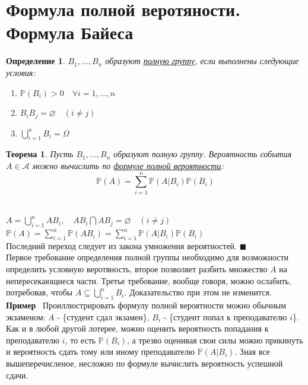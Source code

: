 \documentclass[12pt]{article}
\newtheorem{Th}{Теорема}
\newtheorem{Def}{Определение}
\newenvironment{Proof}{\par\noindent{\bf Доказательство}}{$\blacksquare$}
\newenvironment{Ex}{{\bf Пример}\ }{}
\numberwithin{Th}{section}
\numberwithin{Def}{section}
\numberwithin{Lem}{section}
\numberwithin{St}{section}
\numberwithin{equation}{section}
\newcommand\Pro{\mathbb{P}} %
\newcommand\Ev{\mathscr{A}} %
\begin{document}
\section{Формула полной веротяности. Формула Байеса}

\begin{Def}
$B_1, \ldots, B_n$ образуют \underline{полную группу}, если выполнены следующие условия:
	\begin{enumerate}
		\item $\Pro(B_i) > 0 \quad \forall i = 1, \ldots, n$
		\item $B_iB_j = \varnothing \quad (i \not= j)$
		\item $\bigcup\limits_{i=1}^nB_i = \Omega$
	\end{enumerate}
\end{Def}

\begin{Th}
Пусть $B_1, \ldots, B_n$ образуют полную группу. Вероятность события $A \in \Ev$ можно вычислить по \underline{формуле полной вероятности}:
$$\Pro(A) = \sum\limits_{i=1}^{n} \Pro(A|B_i)\Pro(B_i)$$
\end{Th}

\begin{Proof}
\\
$A=\bigcup\limits_{i=1}^{n}AB_i, \quad AB_i \bigcap AB_j = \varnothing \quad (i \not= j)$ \\
$\Pro(A) = \sum\limits_{i=1}^n \Pro(AB_i) = \sum\limits_{i=1}^{n} \Pro(A|B_i)\Pro(B_i)$ \\
Последний переход следует из  закона умножения вероятностей.
\end{Proof}
\\

Первое требование определения полной группы необходимо для возможности определить условную веротяность, второе позволяет 
разбить множество $A$ на непересекающиеся части. Третье требование, вообще говоря, можно ослабить, потребовав, чтобы $A \subseteq \bigcup\limits_{i=1}^nB_i$.
Доказательство при этом не изменится. \\
\begin{Ex}
Проиллюстрировать формулу полной вероятности можно обычным экзаменом: $A$ - \{студент сдал экзамен\}, $B_i$ - \{студент попал к преподавателю $i$\}.
Как и в любой другой лотерее, можно оценить вероятность попадания к преподавателю $i$, то есть $\Pro(B_i)$, а трезво оценивая свои силы можно прикинуть 
и вероятность сдать тому или иному преподавателю $\Pro(A|B_i)$. Зная все вышеперечисленое, несложно по формуле вычислить вероятность успешной сдачи.
\end{Ex}
\\
\end{document}
